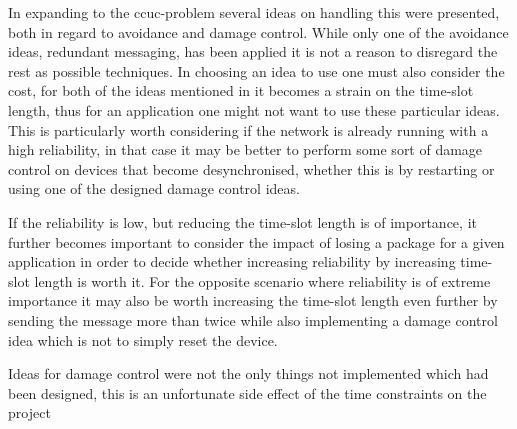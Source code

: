 \bigskip \noindent
In expanding to the \gls{ccuc}-problem several ideas on handling this were presented, both in regard to avoidance and damage control.
While only one of the avoidance ideas, redundant messaging, has been applied it is not a reason to disregard the rest as possible techniques.
In choosing an idea to use one must also consider the cost, for both of the ideas mentioned in  it becomes a strain on the time-slot length, thus for an application one might not want to use these particular ideas.
This is particularly worth considering if the network is already running with a high reliability, in that case it may be better to perform some sort of damage control on devices that become desynchronised, whether this is by restarting or using one of the designed damage control ideas. 

If the reliability is low, but reducing the time-slot length is of importance, it further becomes important to consider the impact of losing a package for a given application in order to decide whether increasing reliability by increasing time-slot length is worth it.
For the opposite scenario where reliability is of extreme importance it may also be worth increasing the time-slot length even further by sending the message more than twice while also implementing a damage control idea which is not to simply reset the device.

\bigskip \noindent
Ideas for damage control were not the only things not implemented which had been designed, this is an unfortunate side effect of the time constraints on the project